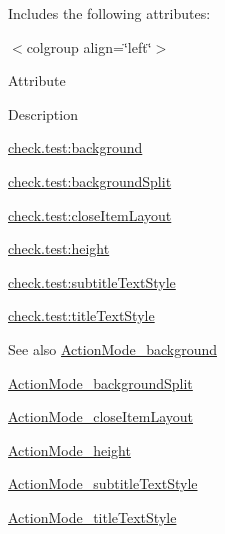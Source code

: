 Includes the following attributes\+:

\begin{TabularC}{0}
\hline
\end{TabularC}
$<$colgroup align=\char`\"{}left\char`\"{}$>$ 

Attribute

Description 

{\ttfamily \hyperlink{classcheck_1_1test_1_1_r_1_1styleable_a2bc48f11c96ca1baa661fbf035348f1b}{check.\+test\+:background}}

{\ttfamily \hyperlink{classcheck_1_1test_1_1_r_1_1styleable_a34087089909e4f53d9a05b693bbd6717}{check.\+test\+:background\+Split}}

{\ttfamily \hyperlink{classcheck_1_1test_1_1_r_1_1styleable_a6ac0eea3f70ecdbef1e54a263fcd19f9}{check.\+test\+:close\+Item\+Layout}}

{\ttfamily \hyperlink{classcheck_1_1test_1_1_r_1_1styleable_a2c8d25c4f35e83ab690e40cb3a840c72}{check.\+test\+:height}}

{\ttfamily \hyperlink{classcheck_1_1test_1_1_r_1_1styleable_a4c146f8a39f38c5f2aa884f74d24b896}{check.\+test\+:subtitle\+Text\+Style}}

{\ttfamily \hyperlink{classcheck_1_1test_1_1_r_1_1styleable_a16a980c21195919de6d38329e1f52a7a}{check.\+test\+:title\+Text\+Style}}

\begin{DoxySeeAlso}{See also}
\hyperlink{classcheck_1_1test_1_1_r_1_1styleable_a2bc48f11c96ca1baa661fbf035348f1b}{Action\+Mode\+\_\+background} 

\hyperlink{classcheck_1_1test_1_1_r_1_1styleable_a34087089909e4f53d9a05b693bbd6717}{Action\+Mode\+\_\+background\+Split} 

\hyperlink{classcheck_1_1test_1_1_r_1_1styleable_a6ac0eea3f70ecdbef1e54a263fcd19f9}{Action\+Mode\+\_\+close\+Item\+Layout} 

\hyperlink{classcheck_1_1test_1_1_r_1_1styleable_a2c8d25c4f35e83ab690e40cb3a840c72}{Action\+Mode\+\_\+height} 

\hyperlink{classcheck_1_1test_1_1_r_1_1styleable_a4c146f8a39f38c5f2aa884f74d24b896}{Action\+Mode\+\_\+subtitle\+Text\+Style} 

\hyperlink{classcheck_1_1test_1_1_r_1_1styleable_a16a980c21195919de6d38329e1f52a7a}{Action\+Mode\+\_\+title\+Text\+Style} 
\end{DoxySeeAlso}
\hypertarget{classcheck_1_1test_1_1_r_1_1styleable_a2bc48f11c96ca1baa661fbf035348f1b}{}
